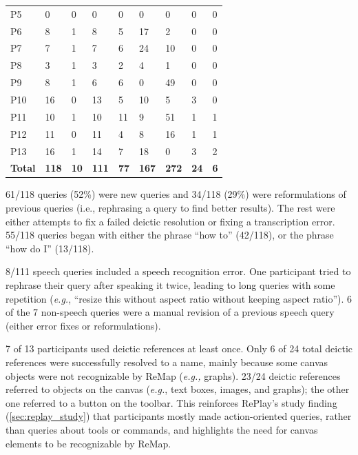 \begin{table}[b!]
{\begin{tabular}{lllllllll}
P5 & 0 & 0 & 0 & 0 & 0 & 0 & 0 & 0 \\
P6 & 8 & 1 & 8 & 5 & 17 & 2 & 0 & 0 \\
P7 & 7 & 1 & 7 & 6 & 24 & 10 & 0 & 0 \\
P8 & 3 & 1 & 3 & 2 & 4 & 1 & 0 & 0 \\
P9 & 8 & 1 & 6 & 6 & 0 & 49 & 0 & 0 \\
P10 & 16 & 0 & 13 & 5 & 10 & 5 & 3 & 0 \\
P11 & 10 & 1 & 10 & 11 & 9 & 51 & 1 & 1 \\
P12 & 11 & 0 & 11 & 4 & 8 & 16 & 1 & 1 \\
P13 & 16 & 1 & 14 & 7 & 18 & 0 & 3 & 2 \\
\textbf{Total} & \textbf{118} & \textbf{10} & \textbf{111} & \textbf{77} & \textbf{167} & \textbf{272} & \textbf{24} & \textbf{6}
\end{tabular}
}
\end{table}

61/118 queries (52\%) were new queries and 34/118 (29\%) were reformulations of previous queries (i.e., rephrasing a query to find better results). The rest were either attempts to fix a failed deictic resolution or fixing a transcription error. 55/118 queries began with either the phrase ``how to'' (42/118), or the phrase ``how do I'' (13/118). 

8/111 speech queries included a speech recognition error. One participant tried to rephrase their query after speaking it twice, leading to long queries with some repetition (\textit{e.g.}, ``resize this without aspect ratio without keeping aspect ratio''). 6 of the 7 non-speech queries were a manual revision of a previous speech query (either error fixes or reformulations). 

7 of 13 participants used deictic references at least once. Only 6 of 24 total deictic references were successfully resolved to a name, mainly because some canvas objects were not recognizable by ReMap (\textit{e.g.,} graphs). 23/24 deictic references referred to objects on the canvas (\textit{e.g.}, text boxes, images, and graphs); the other one referred to a button on the toolbar. This reinforces RePlay's study finding (\autoref{sec:replay_study}) that participants mostly made action-oriented queries, rather than queries about tools or commands, and highlights the need for canvas elements to be recognizable by ReMap.

